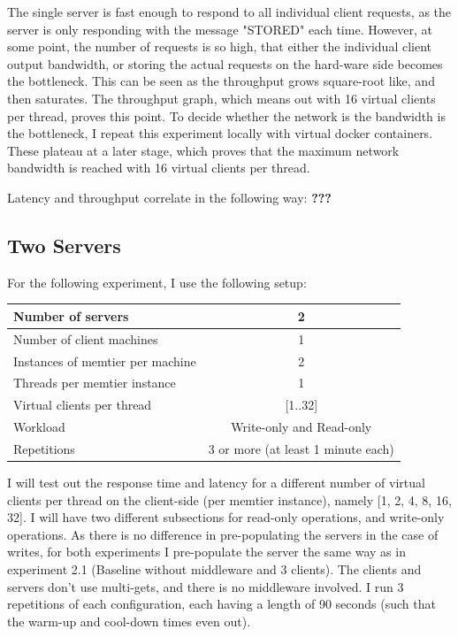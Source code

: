 \documentclass[11pt,a4paper]{article}
\begin{document}
The single server is fast enough to respond to all individual client requests, as the server is only responding with the message "STORED" each time.
However, at some point, the number of requests is so high, that either the individual client output bandwidth, or storing the actual requests on the hard-ware side becomes the bottleneck.
This can be seen as the throughput grows square-root like, and then saturates.
The throughput graph, which means out with 16 virtual clients per thread, proves this point.
To decide whether the network is the bandwidth is the bottleneck, I repeat this experiment locally with virtual docker containers.
These plateau at a later stage, which proves that the maximum network bandwidth is reached with 16 virtual clients per thread.

Latency and throughput correlate in the following way: \textbf{???}

\subsection{Two Servers}

For the following experiment, I use the following setup:

\begin{center}
	\scriptsize{
		\begin{tabular}{|l|c|}
			\hline Number of servers                & 2                        \\ 
			\hline Number of client machines        & 1                        \\ 
			\hline Instances of memtier per machine & 2                        \\ 
			\hline Threads per memtier instance     & 1                        \\
			\hline Virtual clients per thread       & [1..32]                  \\ 
			\hline Workload                         & Write-only and Read-only \\
			\hline Repetitions                      & 3 or more (at least 1 minute each)                \\ 
			\hline 
		\end{tabular}
	} 
\end{center}

I will test out the response time and latency for a different number of virtual clients per thread on the client-side (per memtier instance), namely [1, 2, 4, 8, 16, 32].
I will have two different subsections for read-only operations, and write-only operations.
As there is no difference in pre-populating the servers in the case of writes, for both experiments I pre-populate the server the same way as in experiment 2.1 (Baseline without middleware and 3 clients).
The clients and servers don't use multi-gets, and there is no middleware involved.
I run 3 repetitions of each configuration, each having a length of 90 seconds (such that the warm-up and cool-down times even out).
\end{document}
